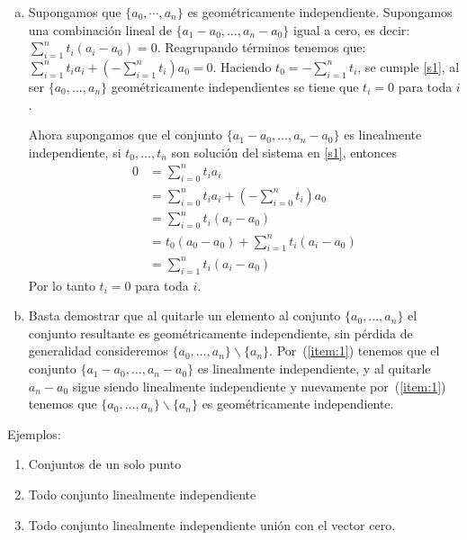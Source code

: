 \begin{Dem}
\begin{enumerate}[(a)]
\item\label{item:1} Supongamos que $\{a_0,\cdots,a_n\}$ es geométricamente
  independiente. Supongamos una combinación lineal de
  $\{a_1-a_0,\ldots,a_n-a_0\}$ igual a cero, es decir: $\sum_{i=1}^{n}t_i(a_i-a_0)=0$. Reagrupando términos tenemos que: $\sum_{i=1}^{n}t_ia_i + (-\sum_{i=1}^{n}t_i)a_0=0$. Haciendo $t_0 = -\sum_{i=1}^{n}t_i$, se cumple \ref{s1}, al ser $\{a_0,\ldots,a_n\}$ geométricamente independientes se tiene que $t_i=0$ para toda $i$.

Ahora supongamos que el conjunto $\{a_1-a_0,\ldots,a_n-a_0\}$ es linealmente independiente, si $t_0,\ldots,t_n$ son solución del sistema en \ref{s1}, entonces 
\begin{align*}
 0&=\sum_{i=0}^{n}t_ia_i\\
 &=\sum_{i=0}^{n}t_ia_i + (-\sum_{i=0}^{n}t_i)a_0\\
 &=\sum_{i=0}^{n}t_i(a_i-a_0)\\ 
 &= t_0(a_0-a_0) + \sum_{i=1}^{n}t_i(a_i-a_0)\\
 &=\sum_{i=1}^{n}t_i(a_i-a_0)
\end{align*}
Por lo tanto $t_i=0$ para toda $i$.
\item Basta demostrar que al quitarle un elemento al conjunto $\{a_0,\ldots,a_n\}$
el conjunto resultante es geométricamente independiente, sin pérdida
de generalidad consideremos $\{a_0,\ldots,a_n\}\backslash\{a_n\}$. Por~(\ref{item:1}) tenemos que el
conjunto $\{a_1-a_0,\ldots,a_n-a_0\}$ es linealmente independiente, y al quitarle
$a_n-a_0$ sigue siendo linealmente independiente y nuevamente por~(\ref{item:1}) 
tenemos que $\{a_0,\ldots,a_n\}\backslash\{a_n\}$ es geométricamente independiente.
\end{enumerate}
\end{Dem}
Ejemplos:
\begin{enumerate}
\item Conjuntos de un solo punto
\item Todo conjunto linealmente independiente
\item Todo conjunto linealmente independiente unión con el vector cero. 
\end{enumerate}

